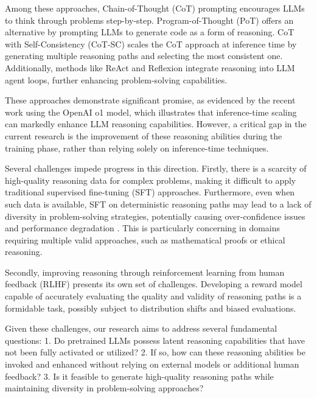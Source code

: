 Among these approaches, Chain-of-Thought (CoT) prompting \cite{DBLP:conf/nips/Wei0SBIXCLZ22} encourages LLMs to think through problems step-by-step. Program-of-Thought (PoT) \cite{DBLP:journals/tmlr/ChenM0C23} offers an alternative by prompting LLMs to generate code as a form of reasoning. CoT with Self-Consistency (CoT-SC) \cite{DBLP:conf/iclr/0002WSLCNCZ23} scales the CoT approach at inference time by generating multiple reasoning paths and selecting the most consistent one. Additionally, methods like ReAct \cite{DBLP:conf/iclr/YaoZYDSN023} and Reflexion \cite{DBLP:conf/nips/ShinnCGNY23} integrate reasoning into LLM agent loops, further enhancing problem-solving capabilities.

These approaches demonstrate significant promise, as evidenced by the recent work using the OpenAI o1 model, which illustrates that inference-time scaling can markedly enhance LLM reasoning capabilities. However, a critical gap in the current research is the improvement of these reasoning abilities during the training phase, rather than relying solely on inference-time techniques.

Several challenges impede progress in this direction. Firstly, there is a scarcity of high-quality reasoning data for complex problems, making it difficult to apply traditional supervised fine-tuning (SFT) approaches. Furthermore, even when such data is available, SFT on deterministic reasoning paths may lead to a lack of diversity in problem-solving strategies, potentially causing over-confidence issues and performance degradation \cite{cobbe2021training}. This is particularly concerning in domains requiring multiple valid approaches, such as mathematical proofs or ethical reasoning.

Secondly, improving reasoning through reinforcement learning from human feedback (RLHF) presents its own set of challenges. Developing a reward model capable of accurately evaluating the quality and validity of reasoning paths is a formidable task, possibly subject to distribution shifts and biased evaluations.

Given these challenges, our research aims to address several fundamental questions:
1. Do pretrained LLMs possess latent reasoning capabilities that have not been fully activated or utilized?
2. If so, how can these reasoning abilities be invoked and enhanced without relying on external models or additional human feedback?
3. Is it feasible to generate high-quality reasoning paths while maintaining diversity in problem-solving approaches?

